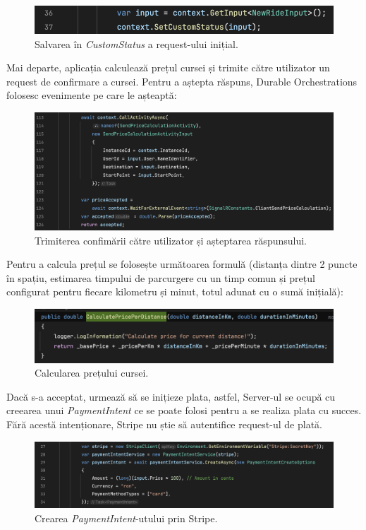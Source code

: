 \begin{figure}[H]
    \centering
    \includegraphics[width=14cm]{Assets/saveCustomStatus.png}
    \caption{Salvarea în \textit{CustomStatus} a request-ului inițial.}
    \label{fig:saveCustomStatus}
\end{figure}

Mai departe, aplicația calculează prețul cursei și trimite către utilizator un request de confirmare a cursei.
Pentru a aștepta răspuns, Durable Orchestrations folosesc evenimente pe care le așteaptă:
\begin{figure}[H]
    \centering
    \includegraphics[width=16cm]{Assets/waitForEvent.png}
    \caption{Trimiterea confimării către utilizator și așteptarea răspunsului.}
    \label{fig:waitForEvent}
\end{figure}
Pentru a calcula prețul se folosește următoarea formulă (distanța dintre 2 puncte în spațiu, estimarea timpului de
parcurgere cu un timp comun și prețul configurat pentru fiecare kilometru și minut, totul adunat cu o sumă inițială):
\begin{figure}[H]
    \centering
    \includegraphics[width=15cm]{Assets/calculatePrice.png}
    \caption{Calcularea prețului cursei.}
    \label{fig:calculatePrice}
\end{figure}
Dacă s-a acceptat, urmează să se inițieze plata, astfel, Server-ul se ocupă cu creearea
unui \textit{PaymentIntent} ce se poate folosi pentru a se realiza plata cu succes. Fără acestă intenționare,
Stripe nu știe să autentifice request-ul de plată.
\begin{figure}[H]
    \centering
    \includegraphics[width=16cm]{Assets/intent.png}
    \caption{Crearea \textit{PaymentIntent}-utului prin Stripe.}
    \label{fig:intent}
\end{figure}
